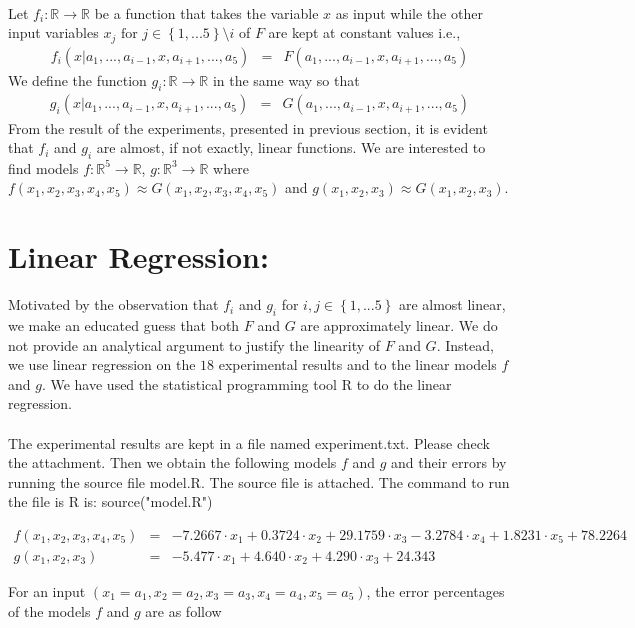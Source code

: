 \documentclass[11pt]{article}
\begin{document}
\paragraph{}
Let $f_i:\mathbb{R} \rightarrow \mathbb{R}$ be a function that takes the variable $x$ as input while the other input variables $x_{j} \text{ for } j \in \left\lbrace1,...5\right\rbrace\setminus{i}$ of $F$ are kept at constant values i.e., 
\begin{eqnarray*}
f_i(x\vert a_1,...,a_{i-1},x,a_{i+1},...,a_{5}) &=& F(a_1,...,a_{i-1},x,a_{i+1},...,a_{5})
\end{eqnarray*}
We define the function $g_i:\mathbb{R} \rightarrow \mathbb{R}$ in the same way so that 
\begin{eqnarray*}
g_i(x\vert a_1,...,a_{i-1},x,a_{i+1},...,a_{5}) &=& G(a_1,...,a_{i-1},x,a_{i+1},...,a_{5})
\end{eqnarray*} 
From the result of the experiments, presented in previous section, it is evident that $f_i$ and  $g_i$ are almost, if not exactly, linear functions. We are interested to find models $f:\mathbb{R}^5 \rightarrow \mathbb{R}$, $g:\mathbb{R}^3 \rightarrow \mathbb{R}$ where $f(x_1,x_2,x_3,x_4,x_5) \approx G(x_1,x_2,x_3,x_4,x_5)$ and $g(x_1,x_2,x_3) \approx G(x_1,x_2,x_3)$. 
\section{Linear Regression:}
Motivated by the observation that $f_i$ and $g_i$ for $i,j \in  \left\lbrace1,...5\right\rbrace$ are almost linear, we make an educated guess that both $F$ and $G$ are approximately linear. We do not provide an analytical argument to justify the linearity of $F$ and $G$. Instead, we use linear regression on the $18$ experimental results and to the linear models $f$ and $g$. We have used the statistical programming tool R to do the linear regression. 
\paragraph{}
The experimental results are kept in a file named \textsf{experiment.txt}. Please check the attachment. Then we obtain the following models $f$ and $g$ and their errors by running the source file \textsf{model.R}. The source file is attached. The command to run the file is R is: \textsf{source("model.R")}

\begin{tiny}
\begin{eqnarray*}
f(x_1, x_2, x_3, x_4, x_5) &=& -7.2667 \cdot x_1 + 0.3724 \cdot x_2 + 29.1759 \cdot x_3 - 3.2784 \cdot x_4 + 1.8231 \cdot x_5 + 78.2264 \\
g(x_1, x_2, x_3) &=& -5.477 \cdot x_1 + 4.640 \cdot x_2 + 4.290 \cdot x_3 + 24.343
\end{eqnarray*}
\end{tiny}
For an input $(x_1 = a_1,x_2 = a_2,x_3 = a_3,x_4 = a_4,x_5 = a_5)$, the error percentages of the models $f$ and $g$ are as follow
\end{document}
